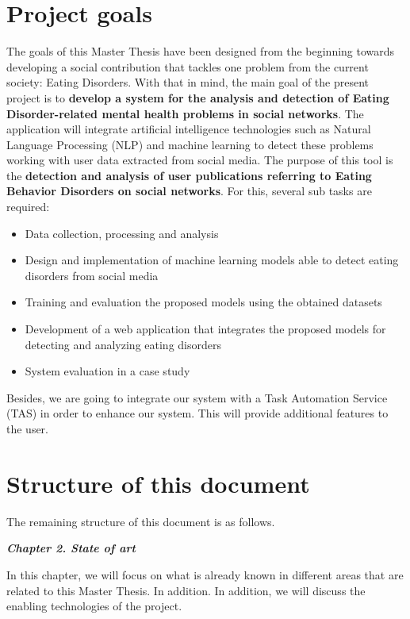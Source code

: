 \section{Project goals}
\label{sec:goals}
The goals of this Master Thesis have been designed from the beginning towards developing a social contribution that tackles one problem from the current society: Eating Disorders. With that in mind, the main goal of the present project is to \textbf{develop a system for the analysis and detection of Eating Disorder-related mental health problems in social networks}. The application will integrate artificial intelligence technologies such as Natural Language Processing (NLP) and machine learning to detect these problems working with user data extracted from social media. The purpose of this tool is the \textbf{detection and analysis of user publications referring to Eating Behavior Disorders on social networks}. For this, several sub tasks are required:

\begin{itemize}
    \item Data collection, processing and analysis
    \item Design and implementation of machine learning models able to detect eating disorders from social media
    \item Training and evaluation the proposed models using the obtained datasets
    \item Development of a web application that integrates the proposed models for detecting and analyzing eating disorders
    \item System evaluation in a case study
\end{itemize}

Besides, we are going to integrate our system with a Task Automation Service (TAS) in order to enhance our system. This will provide additional features to the user.

\clearpage

\section{Structure of this document}

The remaining structure of this document is as follows.

\textbf{\textit{Chapter 2. State of art}}

In this chapter, we will focus on what is already known in different areas that are related to this Master Thesis. In addition. In addition, we will discuss the enabling technologies of
the project.

